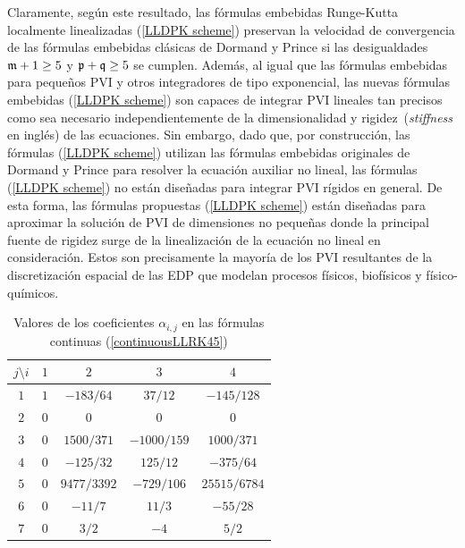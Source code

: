 Claramente, según este resultado, las fórmulas embebidas Runge-Kutta localmente linealizadas (\ref{LLDPK scheme}) preservan la velocidad de convergencia de las fórmulas embebidas clásicas de Dormand y Prince si las desigualdades $\mathfrak{m}+1 \ge 5 $ y $\mathfrak{p}+\mathfrak{q} \ge 5$ se cumplen. Además, al igual que las fórmulas embebidas para pequeños PVI y otros integradores de tipo exponencial, las nuevas fórmulas embebidas (\ref{LLDPK scheme}) son capaces de integrar PVI lineales tan precisos como sea necesario independientemente de la dimensionalidad y rigidez~(\textit{stiffness} en inglés) de las ecuaciones. Sin embargo, dado que, por construcción, las fórmulas (\ref{LLDPK scheme}) utilizan las fórmulas embebidas originales de Dormand y Prince para resolver la ecuación auxiliar no lineal, las fórmulas (\ref{LLDPK scheme}) no están diseñadas para integrar PVI rígidos en general. De esta forma, las fórmulas propuestas (\ref{LLDPK scheme}) están diseñadas para aproximar la solución de PVI de dimensiones no pequeñas donde la principal fuente de rigidez surge de la linealización de la ecuación no lineal en consideración. Estos son precisamente la mayoría de los PVI resultantes de la discretización espacial de las EDP que modelan procesos físicos, biofísicos y físico-químicos.
\begin{table}[htb]
	\caption{ Valores de los coeficientes $\alpha _{i,j}$ en las fórmulas continuas (\ref{continuousLLRK45})\label{Table continuous RK}}
	\centering
	\begin{tabular}{ccccc}
		\hline
		$j\setminus i$ & $1$ & $2$ & $3$ & $4$ \\
		\hline
		$1$ & $1$ & $-183/64$ & $37/12$ & $-145/128$ \\
		$2$ & $0$ & $0$ & $0$ & $0$ \\
		$3$ & $0$ & $1500/371$ & $-1000/159$ & $1000/371$ \\
		$4$ & $0$ & $-125/32$ & $125/12$ & $-375/64$ \\
		$5$ & $0$ &	$9477/3392$ & $-729/106$ & $25515/6784$ \\
		$6$ & $0$ &	$-11/7$ & $11/3$ & $-55/28$ \\
		$7$ & $0$ & $3/2$ & $-4$ & $5/2$ \\
		\hline
	\end{tabular}
\end{table}

